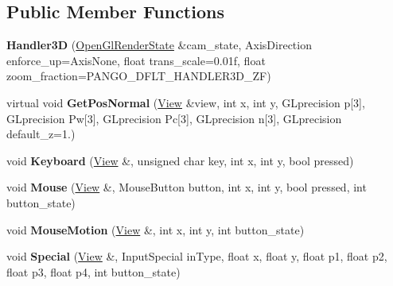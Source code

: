 \subsection*{Public Member Functions}
\begin{DoxyCompactItemize}
\item 
{\bfseries Handler3D} (\hyperlink{classpangolin_1_1_open_gl_render_state}{Open\+Gl\+Render\+State} \&cam\+\_\+state, Axis\+Direction enforce\+\_\+up=Axis\+None, float trans\+\_\+scale=0.\+01f, float zoom\+\_\+fraction=\+P\+A\+N\+G\+O\+\_\+\+D\+F\+L\+T\+\_\+\+H\+A\+N\+D\+L\+E\+R3\+D\+\_\+\+Z\+F)\hypertarget{structpangolin_1_1_handler3_d_aeb1fcf641c24a7921d2528812be71f6c}{}\label{structpangolin_1_1_handler3_d_aeb1fcf641c24a7921d2528812be71f6c}

\item 
virtual void {\bfseries Get\+Pos\+Normal} (\hyperlink{structpangolin_1_1_view}{View} \&view, int x, int y, G\+Lprecision p\mbox{[}3\mbox{]}, G\+Lprecision Pw\mbox{[}3\mbox{]}, G\+Lprecision Pc\mbox{[}3\mbox{]}, G\+Lprecision n\mbox{[}3\mbox{]}, G\+Lprecision default\+\_\+z=1.)\hypertarget{structpangolin_1_1_handler3_d_a15a0805e015e69eb0723f6c5ffa1cd1f}{}\label{structpangolin_1_1_handler3_d_a15a0805e015e69eb0723f6c5ffa1cd1f}

\item 
void {\bfseries Keyboard} (\hyperlink{structpangolin_1_1_view}{View} \&, unsigned char key, int x, int y, bool pressed)\hypertarget{structpangolin_1_1_handler3_d_afef8f0be6394bdd2ba347f188d6c5cac}{}\label{structpangolin_1_1_handler3_d_afef8f0be6394bdd2ba347f188d6c5cac}

\item 
void {\bfseries Mouse} (\hyperlink{structpangolin_1_1_view}{View} \&, Mouse\+Button button, int x, int y, bool pressed, int button\+\_\+state)\hypertarget{structpangolin_1_1_handler3_d_a915108c717411e1e56777e3a3e3eb626}{}\label{structpangolin_1_1_handler3_d_a915108c717411e1e56777e3a3e3eb626}

\item 
void {\bfseries Mouse\+Motion} (\hyperlink{structpangolin_1_1_view}{View} \&, int x, int y, int button\+\_\+state)\hypertarget{structpangolin_1_1_handler3_d_a71a05eec4a20c7ae8f179ff91f59cbd7}{}\label{structpangolin_1_1_handler3_d_a71a05eec4a20c7ae8f179ff91f59cbd7}

\item 
void {\bfseries Special} (\hyperlink{structpangolin_1_1_view}{View} \&, Input\+Special in\+Type, float x, float y, float p1, float p2, float p3, float p4, int button\+\_\+state)\hypertarget{structpangolin_1_1_handler3_d_a48df691909b0070f063db6c4b5fb6fc3}{}\label{structpangolin_1_1_handler3_d_a48df691909b0070f063db6c4b5fb6fc3}

\end{DoxyCompactItemize}
